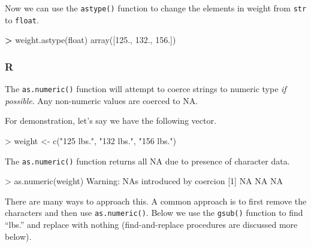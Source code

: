 \documentclass[
]{book}
\newenvironment{Shaded}{\begin{snugshade}}{\end{snugshade}}
\newcommand{\BuiltInTok}[1]{#1}
\newcommand{\ConstantTok}[1]{\textcolor[rgb]{0.00,0.00,0.00}{#1}}
\newcommand{\DecValTok}[1]{\textcolor[rgb]{0.00,0.00,0.81}{#1}}
\newcommand{\FloatTok}[1]{\textcolor[rgb]{0.00,0.00,0.81}{#1}}
\newcommand{\FunctionTok}[1]{\textcolor[rgb]{0.00,0.00,0.00}{#1}}
\newcommand{\NormalTok}[1]{#1}
\newcommand{\OperatorTok}[1]{\textcolor[rgb]{0.81,0.36,0.00}{\textbf{#1}}}
\newcommand{\OtherTok}[1]{\textcolor[rgb]{0.56,0.35,0.01}{#1}}
\newcommand{\SpecialCharTok}[1]{\textcolor[rgb]{0.00,0.00,0.00}{#1}}
\newcommand{\StringTok}[1]{\textcolor[rgb]{0.31,0.60,0.02}{#1}}
\begin{document}
Now we can use the \texttt{astype()} function to change the elements in weight from \texttt{str} to \texttt{float}.

\begin{Shaded}
\begin{Highlighting}[]
\OperatorTok{\textgreater{}}\NormalTok{ weight.astype(}\BuiltInTok{float}\NormalTok{)}
\NormalTok{array([}\FloatTok{125.}\NormalTok{, }\FloatTok{132.}\NormalTok{, }\FloatTok{156.}\NormalTok{])}
\end{Highlighting}
\end{Shaded}

\hypertarget{r-23}{%
\subsubsection*{R}\label{r-23}}

The \texttt{as.numeric()} function will attempt to coerce strings to numeric type \emph{if possible}. Any non-numeric values are coerced to NA.

For demonstration, let's say we have the following vector.

\begin{Shaded}
\begin{Highlighting}[]
\SpecialCharTok{\textgreater{}}\NormalTok{ weight }\OtherTok{\textless{}{-}} \FunctionTok{c}\NormalTok{(}\StringTok{"125 lbs."}\NormalTok{, }\StringTok{"132 lbs."}\NormalTok{, }\StringTok{"156 lbs."}\NormalTok{)}
\end{Highlighting}
\end{Shaded}

The \texttt{as.numeric()} function returns all NA due to presence of character data.

\begin{Shaded}
\begin{Highlighting}[]
\SpecialCharTok{\textgreater{}} \FunctionTok{as.numeric}\NormalTok{(weight)}
\NormalTok{Warning}\SpecialCharTok{:}\NormalTok{ NAs introduced by coercion}
\NormalTok{[}\DecValTok{1}\NormalTok{] }\ConstantTok{NA} \ConstantTok{NA} \ConstantTok{NA}
\end{Highlighting}
\end{Shaded}

There are many ways to approach this. A common approach is to first remove the characters and then use \texttt{as.numeric()}. Below we use the \texttt{gsub()} function to find ``lbs.'' and replace with nothing (find-and-replace procedures are discussed more below).
\end{document}
